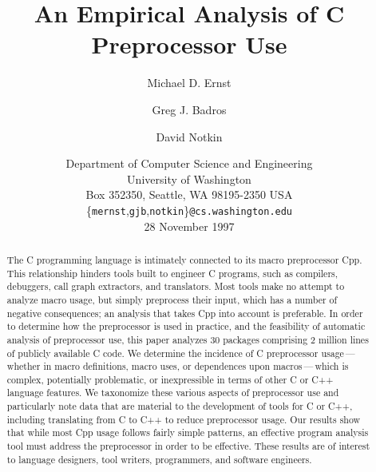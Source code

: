 \documentclass[10pt]{article}
\def\numpackages{30}
\def\numlines{2 million}
\begin{document}
% 


\title{An Empirical Analysis of C Preprocessor Use}

\author{Michael D. Ernst \and Greg J. Badros \and David Notkin}

\date{%
Department of Computer Science and Engineering \\
University of Washington \\
Box 352350, Seattle, WA  98195-2350  USA \\
{\small \{{\tt mernst},{\tt gjb},{\tt notkin}\}{\tt @cs.washington.edu}} \\
28 November 1997}  

\maketitle

\begin{abstract}
  The C programming language is intimately connected to its macro
  preprocessor Cpp.  This relationship hinders tools built to engineer C
  programs, such as compilers, debuggers, call graph extractors, and
  translators.  Most tools make no attempt to analyze macro usage, but
  simply preprocess their input, which has a number of negative
  consequences; an analysis that takes Cpp into account is preferable.  In
  order to determine how the preprocessor is used in practice, and the
  feasibility of automatic analysis of preprocessor use, this paper
  analyzes {\numpackages} packages comprising {\numlines} lines of publicly
  available C code.  We determine the incidence of C preprocessor
  usage\,---\,whether in macro definitions, macro uses, or dependences upon
  macros\,---\,which is complex, potentially problematic, or inexpressible
  in terms of other C or C++ language features.  We taxonomize these
  various aspects of preprocessor use and particularly note data that are
  material to the development of tools for C or C++, including translating
  from C to C++ to reduce preprocessor usage.  Our results show that while
  most Cpp usage follows fairly simple patterns, an effective program
  analysis tool must address the preprocessor in order to be effective.
  These results are of interest to language designers, tool writers,
  programmers, and software engineers.
\end{abstract}

\bigskip
\end{document}
